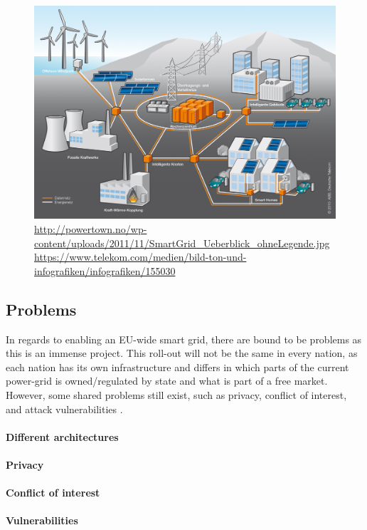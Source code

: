 \begin{figure}
	\includegraphics[width=\textwidth]{figures/SmartGrid_Ueberblick_ohneLegende.jpg}
	\caption{\url{http://powertown.no/wp-content/uploads/2011/11/SmartGrid_Ueberblick_ohneLegende.jpg} \url{https://www.telekom.com/medien/bild-ton-und-infografiken/infografiken/155030}}
	\label{fig:background:smartgrid}
\end{figure}

\subsection{Problems}
In regards to enabling an EU-wide smart grid, there are bound to be problems as this is an immense project.
This roll-out will not be the same in every nation, as each nation has its own infrastructure and differs in which parts of the current power-grid is owned/regulated by state and what is part of a free market.
However, some shared problems still exist, such as privacy, conflict of interest, and attack vulnerabilities \cite{offswitch} \cite{smart_meter_survey}.

\paragraph{Different architectures}

\paragraph{Privacy}

\paragraph{Conflict of interest}

\paragraph{Vulnerabilities}
